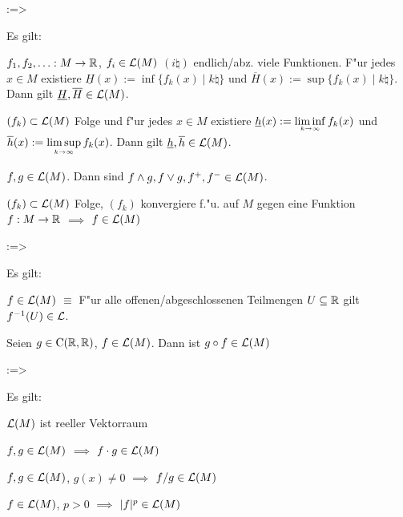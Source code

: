 \theorem:=>{
  Es gilt:
  \begin{stmts}
    \item $f_1,f_2,\ldots:M\to\mathbb R$, $f_i\in\mathcal{L}(M)$ $(i\natural)$ 
      endlich/abz. viele Funktionen. F"ur jedes $x\in M$ existiere 
      $\underline H(x):=\inf\{f_k(x)\mid k\natural\}$ und
      $\overline H(x):=\sup\{f_k(x)\mid k\natural\}$. Dann gilt
      $\underline H,\overline H\in\mathcal{L}(M)$.
    \item $(f_k)\subset\mathcal{L}(M)$ Folge und f"ur jedes $x\in M$ existiere 
      $\underline h(x):=\limesinf k->\infty f_k(x)$ und
      $\overline h(x):=\limessup k->\infty f_k(x)$. Dann gilt
      $\underline h,\overline h\in\mathcal{L}(M)$.
    \item $f,g\in\mathcal{L}(M)$. Dann sind $f\land g,f\lor g,f^+,f^-\in\mathcal{L}(M)$.
    \item $(f_k)\subset\mathcal{L}(M)$ Folge, $(f_k)$ konvergiere f."u. auf $M$
      gegen eine Funktion $f:M\to\mathbb R$ $\implies$ $f\in\mathcal{L}(M)$
    \end{stmts}
  }
\theorem:=>{
  Es gilt:
  \begin{stmts}
    \item $f\in\mathcal{L}(M)$ $\equiv$ F"ur alle offenen/abgeschlossenen
      Teilmengen $U\subseteq\mathbb R$ gilt $f^{-1}(U)\in\mathcal{L}$.
    \item Seien $g\in{\rm C}(\mathbb R,\mathbb R)$, $f\in\mathcal{L}(M)$. Dann ist
      $g\circ f\in\mathcal{L}(M)$
    \end{stmts}
  }  
\theorem:=>{
  Es gilt:
  \begin{stmts}
    \item $\mathcal{L}(M)$ ist reeller Vektorraum
    \item $f,g\in\mathcal{L}(M)$ $\implies$ $f\cdot g\in\mathcal{L}(M)$
    \item $f,g\in\mathcal{L}(M)$, $g(x)\neq 0$ $\implies$ $f/g\in\mathcal{L}(M)$
    \item $f\in\mathcal{L}(M)$, $p>0$ $\implies$ $|f|^p\in\mathcal{L}(M)$
    \end{stmts}
  }
